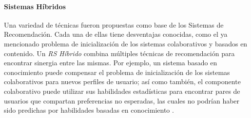 \paragraph{Sistemas Híbridos}
Una variedad de técnicas fueron propuestas como base de los Sistemas de Recomendación. Cada una de ellas tiene desventajas conocidas, como el ya mencionado problema de inicialización de los sistemas colaborativos y basados en contenido. Un \textit{RS Híbrido} combina múltiples técnicas de recomendación para encontrar sinergia entre las mismas. Por ejemplo, un sistema basado en conocimiento puede compensar el problema de inicialización de los sistemas colaborativos para nuevos perfiles de usuario; así como también, el componente colaborativo puede utilizar sus habilidades estadísticas para encontrar pares de usuarios que compartan preferencias no esperadas, las cuales no podrían haber sido predichas por habilidades basadas en conocimiento \citep{burke2007hybrid}.